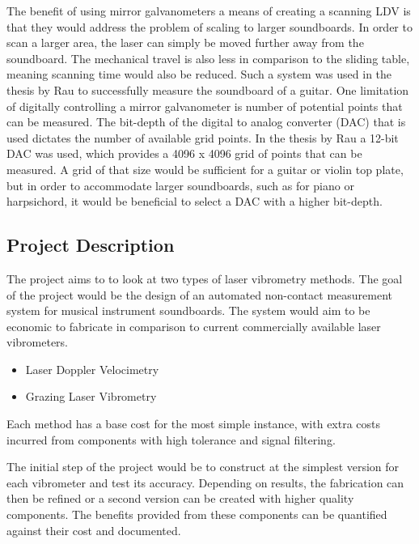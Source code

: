 The benefit of using mirror galvanometers a means of creating a scanning LDV is
that they would address the problem of scaling to larger soundboards. In order
to scan a larger area, the laser can simply be moved further away from the
soundboard. The mechanical travel is also less in comparison to the sliding
table, meaning scanning time would also be reduced. Such a system was used in
the thesis by Rau \cite{rau_vibration_2023} to successfully measure the soundboard of a
guitar. One limitation of digitally controlling a mirror galvanometer is number
of potential points that can be measured. The bit-depth of the digital to analog
converter (DAC) that is used dictates the number of available grid points. In
the thesis by Rau \cite{rau_vibration_2023} a 12-bit DAC was used, which provides a 4096
x 4096 grid of points that can be measured. A grid of that size would be
sufficient for a guitar or violin top plate, but in order to accommodate larger
soundboards, such as for piano or harpsichord, it would be beneficial to select
a DAC with a higher bit-depth.

\hypertarget{project-description}{%
\subsection{Project Description}\label{project-description}}

The project aims to to look at two types of laser vibrometry methods. 
The goal of the project would be the design of an automated non-contact measurement
system for musical instrument soundboards. The system would aim to be economic
to fabricate in comparison to current commercially available laser vibrometers.

\begin{itemize}

\item
  Laser Doppler Velocimetry
\item
  Grazing Laser Vibrometry
\end{itemize}

Each method has a base cost for the most simple instance, with extra costs
incurred from components with high tolerance and signal filtering.

The initial step of the project would be to construct at the simplest version
for each vibrometer and test its accuracy. Depending on results, the fabrication
can then be refined or a second version can be created with higher quality
components. The benefits provided from these components can be quantified
against their cost and documented.


